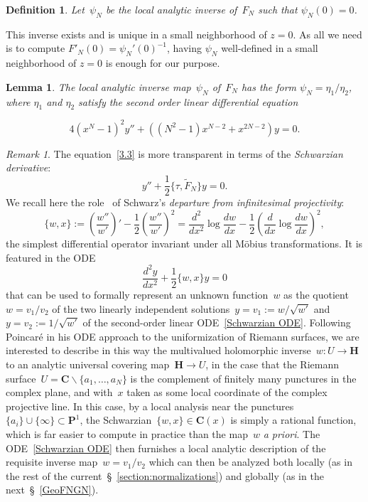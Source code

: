 \documentclass[10pt]{amsart}
\renewcommand\setminus{\smallsetminus}
\def\wF{\widetilde{F}}
\def\PSU{\mathrm{PSU}}
\renewcommand\mathbb{\mathbf}
\newtheorem{lemma}[subsubsection]{Lemma}
\newtheorem{df}[subsubsection]{Definition}
\theoremstyle{remark}
\newtheorem{remark}[subsubsection]{Remark}
\numberwithin{equation}{subsection}
\def\numequation{\addtocounter{subsubsection}{1}\begin{equation}}
\def\C{\mathbf{C}}
\def\H{\mathbf{H}}
\begin{document}
\begin{df} 
Let~$\psi_N$ be the local analytic inverse of~$F_N$ such that $\psi_N(0) = 0$. 
\end{df}

This inverse exists and is unique in a small neighborhood of $z=0$. As all we need is to compute $F'_N(0)=\psi_N'(0)^{-1}$, having $\psi_N$ well-defined in a small neighborhood of $z=0$ is enough for our purpose.



\begin{lemma}\label{diff-eq-FN}
The local analytic inverse map~$\psi_N$ of~$F_N$ has the form $\psi_N = \eta_1 / \eta_2$, where $\eta_1$ and $\eta_2$ satisfy
the second order linear differential equation 
\numequation
\label{3.3}
4  (x^N- 1)^2 y'' + ((N^2-1) x^{N-2} + x^{2N-2}) y = 0.
\end{equation}
\end{lemma}


\begin{remark} \label{remark Hermann Schwarz}
The equation~\eqref{3.3} is more transparent in terms of the \emph{Schwarzian derivative}: 
$$
y'' + \frac{1}{2} \{\tau,\wF_N\} y = 0.
$$ 
We recall here the role~\cite[\S~IV.1.2]{SaintGervais} of Schwarz's \emph{departure from infinitesimal projectivity}: 
$$
\{w, x\} := \left( \frac{w''}{w'} \right)' - \frac{1}{2} \left( \frac{w''}{w'} \right)^2 = \frac{d^2}{dx^2} \log{\frac{dw}{dx}} - \frac{1}{2} \left(
\frac{d}{dx} \log{\frac{dw}{dx}} \right)^2,
$$
 the simplest differential operator invariant under all M\"obius transformations. It is featured in the ODE~\cite[Proposition~VIII.3.5]{SaintGervais}
\begin{equation} \label{Schwarzian ODE}
\frac{d^2y}{dx^2} + \frac{1}{2}\{ w, x \} y = 0
\end{equation}
that can be used to formally represent an unknown function~$w$ as the quotient~$w = v_1/v_2$ of the two linearly independent solutions~$y = v_1 := w/\sqrt{w'}$ and~$y = v_2 := 1/\sqrt{w'}$ of the second-order linear ODE~\eqref{Schwarzian ODE}. Following Poincar\'e in his ODE approach to the uniformization of Riemann surfaces, we are interested to describe in this way the multivalued holomorphic inverse~$w : U \to \H$ to an analytic universal covering map~$\H \to U$, in the case that the Riemann surface~$U = \C \setminus \{a_1, \ldots, a_N\}$ is the complement of finitely many punctures in the complex plane, and with~$x$ taken as some local coordinate of  the complex projective line. In this case, by a local analysis near the punctures~$\{a_i\} \cup \{\infty\} \subset \mathbb{P}^1$, the Schwarzian~$\{w,x\} \in \C(x)$ is simply a rational function, which is far easier to compute in practice than the map~$w$ {\it a priori}. The ODE~\eqref{Schwarzian ODE} then furnishes a local analytic description of the requisite inverse map~$w = v_1/v_2$ which can then be analyzed both locally (as in the rest of the current~\S~\ref{section:normalizations}) and globally (as in the next~\S~\ref{GeoFNGN}).  
\end{remark}
\end{document}
